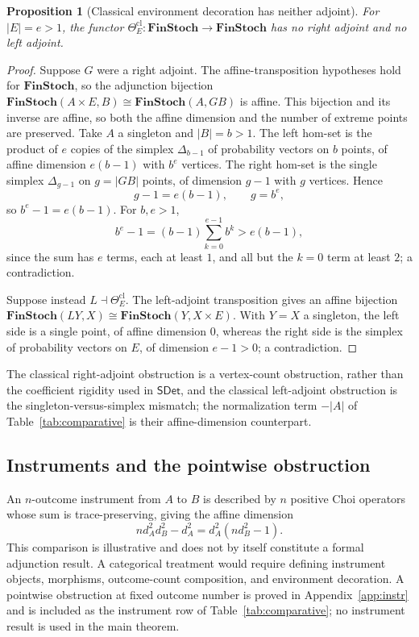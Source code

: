 \documentclass[11pt,a4paper]{article}
\theoremstyle{definition}
\theoremstyle{plain}
\newtheorem{proposition}[theorem]{Proposition}
\theoremstyle{remark}
\newcommand{\SDet}{\mathsf{SDet}}
\begin{document}
\begin{proposition}[Classical environment decoration has neither adjoint]
For $|E|=e>1$, the functor
$\Theta_E^{\mathrm{cl}}:\mathbf{FinStoch}\to\mathbf{FinStoch}$ has no
right adjoint and no left adjoint.
\end{proposition}
\begin{proof}
Suppose $G$ were a right adjoint. The affine-transposition hypotheses
hold for $\mathbf{FinStoch}$, so the adjunction bijection
$\mathbf{FinStoch}(A\times E,B)\cong\mathbf{FinStoch}(A,GB)$ is affine.
This bijection and its inverse are affine, so both the affine dimension
and the number of extreme points are preserved. Take
$A$ a singleton and $|B|=b>1$. The left hom-set is the product of $e$
copies of the simplex $\Delta_{b-1}$ of probability vectors on $b$
points, of affine dimension $e(b-1)$ with $b^e$ vertices. The right
hom-set is the single simplex $\Delta_{g-1}$ on $g=|GB|$ points, of
dimension $g-1$ with $g$ vertices. Hence
\[
g-1=e(b-1),
\qquad
g=b^e,
\]
so $b^e-1=e(b-1)$. For $b,e>1$,
\[
b^e-1=(b-1)\sum_{k=0}^{e-1}b^k>e(b-1),
\]
since the sum has $e$ terms, each at least $1$, and all but the $k=0$
term at least $2$; a contradiction.

Suppose instead $L\dashv\Theta_E^{\mathrm{cl}}$. The left-adjoint
transposition gives an affine bijection
$\mathbf{FinStoch}(LY,X)\cong\mathbf{FinStoch}(Y,X\times E)$. With
$Y=X$ a singleton, the left side is a single point, of affine dimension
$0$, whereas the right side is the simplex of probability vectors on
$E$, of dimension $e-1>0$; a contradiction.
\end{proof}

The classical right-adjoint obstruction is a vertex-count obstruction,
rather than the coefficient rigidity used in $\SDet$, and the classical
left-adjoint obstruction is the singleton-versus-simplex mismatch; the
normalization term $-|A|$ of Table~\ref{tab:comparative} is their
affine-dimension counterpart.

\subsection{Instruments and the pointwise obstruction}

An $n$-outcome instrument from $A$ to $B$ is described by $n$ positive Choi
operators whose sum is trace-preserving, giving the affine dimension
\[
nd_A^2d_B^2-d_A^2=d_A^2(nd_B^2-1).
\]
This comparison is illustrative and does not by itself constitute a formal
adjunction result. A categorical treatment would require defining
instrument objects, morphisms, outcome-count composition, and environment
decoration. A pointwise obstruction at fixed outcome number is proved in
Appendix~\ref{app:instr} and is included as the instrument row of
Table~\ref{tab:comparative}; no instrument result is used in the main
theorem.
\end{document}
